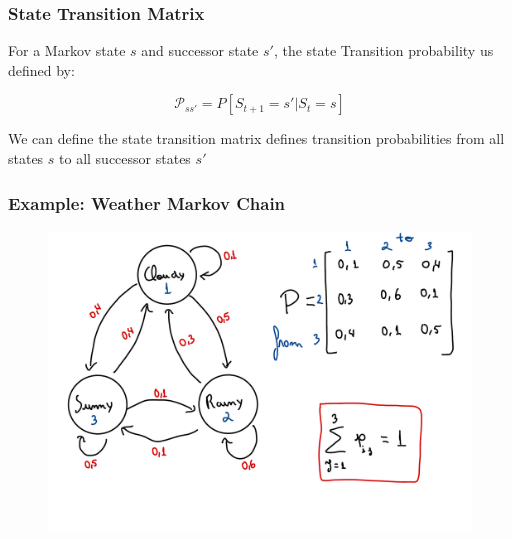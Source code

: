 \begin{frame}
    \frametitle{State Transition Matrix}

    For a Markov state $s$ and successor state $s'$, the state Transition
    probability us defined by:

    $$\mathcal{P}_{ss'} = P[S_{t+1}=s'|S_t=s]$$

    We can define the state transition matrix  defines transition 
    probabilities from all states $s$ to all successor states $s'$

\end{frame}



\begin{frame}
    \frametitle{Example: Weather Markov Chain}
    \begin{figure}
        \centering
        \includegraphics[width=1\textwidth]{sections/markov/figures/weather_markov_chain_01.pdf}
    \end{figure}
\end{frame}



